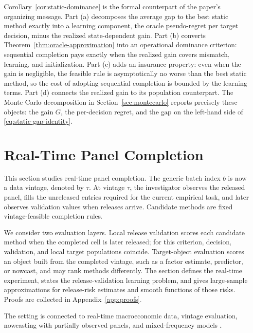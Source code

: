 \documentclass[a4paper, 12pt]{article}
\theoremstyle{plain}
\theoremstyle{remark}
\newcommand{\1}{\mathbf{1}}
\begin{document}
Corollary~\ref{cor:static-dominance} is the formal counterpart of the paper's organizing message. Part (a) decomposes the average gap to the best static method exactly into a learning component, the oracle pseudo-regret per target decision, minus the realized state-dependent gain. Part (b) converts Theorem~\ref{thm:oracle-approximation} into an operational dominance criterion: sequential completion pays exactly when the realized gain covers mismatch, learning, and initialization. Part (c) adds an insurance property: even when the gain is negligible, the feasible rule is asymptotically no worse than the best static method, so the cost of adopting sequential completion is bounded by the learning terms. Part (d) connects the realized gain to its population counterpart. The Monte Carlo decomposition in Section~\ref{sec:montecarlo} reports precisely these objects: the gain \(G\), the per-decision regret, and the gap on the left-hand side of \eqref{eq:static-gap-identity}.

\section{Real-Time Panel Completion}
\label{sec:completion}
\label{sec:specialization}

This section studies real-time panel completion. The generic batch index \(b\) is now a data vintage, denoted by \(\tau\). At vintage \(\tau\), the investigator observes the released panel, fills the unreleased entries required for the current empirical task, and later observes validation values when releases arrive. Candidate methods are fixed vintage-feasible completion rules.

We consider two evaluation layers. Local release validation scores each candidate method when the completed cell is later released; for this criterion, decision, validation, and local target populations coincide. Target-object evaluation scores an object built from the completed vintage, such as a factor estimate, predictor, or nowcast, and may rank methods differently. The section defines the real-time experiment, states the release-validation learning problem, and gives large-sample approximations for release-risk estimates and smooth functions of those risks. Proofs are collected in Appendix~\ref{app:proofs}.

The setting is connected to real-time macroeconomic data, vintage evaluation, nowcasting with partially observed panels, and mixed-frequency models \citep{CroushoreStark2001,McCrackenNg2016,GiannoneReichlinSmall2008,BanburaModugno2014,JungbackerKoopmanWel2011,MarianoMurasawa2003,BaiGhyselsWright2013,AnkargrenJoneus2021}.
\end{document}
